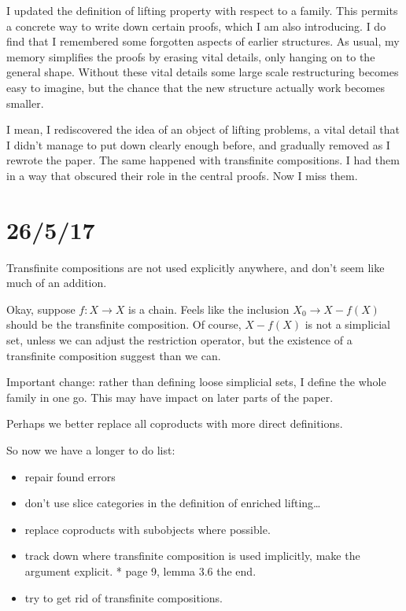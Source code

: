 \documentclass{tac}
\newcommand\of{:}
\begin{document}
I updated the definition of lifting property with respect to a family. This permits a concrete way to write down certain proofs, which I am also introducing.
I do find that I remembered some forgotten aspects of earlier structures. As usual, my memory simplifies the proofs by erasing vital details, only hanging on to the general shape. Without these vital details some large scale restructuring becomes easy to imagine, but the chance that the new structure actually work becomes smaller.

I mean, I rediscovered the idea of an object of lifting problems, a vital detail that I didn't manage to put down clearly enough before, and gradually removed as I rewrote the paper. The same happened with transfinite compositions. I had them in a way that obscured their role in the central proofs. Now I miss them.

\section{26/5/17}

Transfinite compositions are not used explicitly anywhere, and don't seem like much of an addition.

Okay, suppose $f\of X\to X$ is a chain. Feels like the inclusion $X_0 \to X - f(X)$ should be the transfinite composition. Of course, $X - f(X)$ is not a simplicial set, unless we can adjust the restriction operator, but the existence of a transfinite composition suggest than we can.

Important change: rather than defining loose simplicial sets, I define the whole family in one go.
This may have impact on later parts of the paper.

Perhaps we better replace all coproducts with more direct definitions.

So now we have a longer to do list:
\begin{itemize}
\item repair found errors
\item don't use slice categories in the definition of enriched lifting\dots
\item replace coproducts with subobjects where possible.
\item track down where transfinite composition is used implicitly, make the argument explicit.
  * page 9, lemma 3.6 the end.
	
\item try to get rid of transfinite compositions.
\end{itemize}
\end{document}
